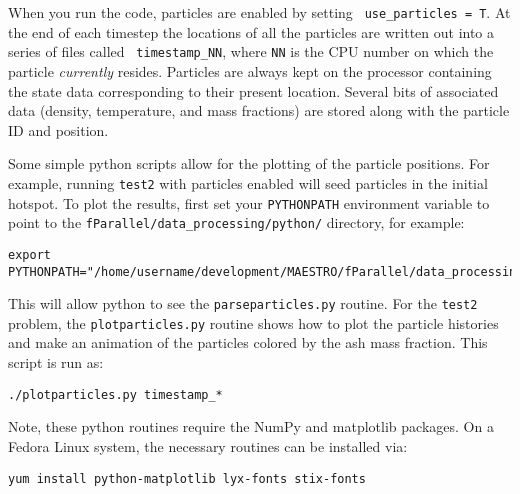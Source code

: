 When you run the code, particles are enabled by setting {\tt
  use\_particles = T}.  At the end of each timestep the locations of
all the particles are written out into a series of files called {\tt
  timestamp\_NN}, where {\tt NN} is the CPU number on which the
particle {\em currently} resides.  Particles are always kept on the
processor containing the state data corresponding to their present
location.  Several bits of associated data (density, temperature, and
mass fractions) are stored along with the particle ID and position.

Some simple python scripts allow for the plotting of the particle
positions.  For example, running {\tt test2} with particles enabled
will seed particles in the initial hotspot.  To plot the results,
first set your {\tt PYTHONPATH} environment variable to point to the
{\tt fParallel/data\_processing/python/} directory, for example:
\begin{verbatim}
export PYTHONPATH="/home/username/development/MAESTRO/fParallel/data_processing/python"
\end{verbatim}
This will allow python to see the {\tt parseparticles.py} routine.
For the {\tt test2} problem, the {\tt plotparticles.py} routine shows
how to plot the particle histories and make an animation of the
particles colored by the ash mass fraction.  This script is run as:
\begin{verbatim}
./plotparticles.py timestamp_*
\end{verbatim}

Note, these python routines require the NumPy and matplotlib packages.
On a Fedora Linux system, the necessary routines can be installed via:
\begin{verbatim}
yum install python-matplotlib lyx-fonts stix-fonts
\end{verbatim}


